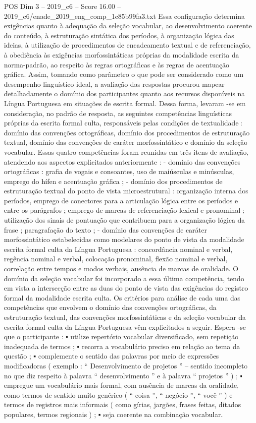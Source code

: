 \begin{textsample}{POS Dim 3 – 2019\_c6 – Score 16.00 – 2019\_c6/enade\_2019\_eng\_comp\_1c85b99fa3.txt}
Essa configuração determina exigências quanto à adequação da seleção vocabular, ao desenvolvimento coerente do conteúdo, à estruturação sintática dos períodos, à organização lógica das ideias, à utilização de procedimentos de encadeamento textual e de referenciação, à obediência às exigências morfossintáticas próprias da modalidade escrita da norma-padrão, ao respeito às regras ortográficas e às regras de acentuação gráfica.
Assim, tomando como parâmetro o que pode ser considerado como um desempenho linguístico ideal, a avaliação das respostas procurou mapear detalhadamente o domínio dos participantes quanto aos recursos disponíveis na Língua Portuguesa em situações de escrita formal.
Dessa forma, levaram -se em consideração, no padrão de resposta, as seguintes competências linguísticas próprias da escrita formal culta, responsáveis pelas condições de textualidade : domínio das convenções ortográficas, domínio dos procedimentos de estruturação textual, domínio das convenções de caráter morfossintático e domínio da seleção vocabular.
Essas quatro competências foram reunidas em três itens de avaliação, atendendo aos aspectos explicitados anteriormente : - domínio das convenções ortográficas : grafia de vogais e consoantes, uso de maiúsculas e minúsculas, emprego do hífen e acentuação gráfica ; - domínio dos procedimentos de estruturação textual do ponto de vista microestrutural : organização interna dos períodos, emprego de conectores para a articulação lógica entre os períodos e entre os parágrafos ; emprego de marcas de referenciação lexical e pronominal ; utilização dos sinais de pontuação que contribuem para a organização lógica da frase ; paragrafação do texto ; - domínio das convenções de caráter morfossintático estabelecidas como modelares do ponto de vista da modalidade escrita formal culta da Língua Portuguesa : concordância nominal e verbal, regência nominal e verbal, colocação pronominal, flexão nominal e verbal, correlação entre tempos e modos verbais, ausência de marcas de oralidade.
O domínio da seleção vocabular foi incorporado a essa última competência, tendo em vista a intersecção entre as duas do ponto de vista das exigências do registro formal da modalidade escrita culta.
Os critérios para análise de cada uma das competências que envolvem o domínio das convenções ortográficas, da estruturação textual, das convenções morfossintáticas e da seleção vocabular da escrita formal culta da Língua Portuguesa vêm explicitados a seguir.
Espera -se que o participante : {\EmojiFont ▪} utilize repertório vocabular diversificado, sem repetição inadequada de termos ; {\EmojiFont ▪} recorra a vocabulário preciso em relação ao tema da questão ; {\EmojiFont ▪} complemente o sentido das palavras por meio de expressões modificadoras ( exemplo : “ Desenvolvimento de projetos ” – sentido incompleto no que diz respeito à palavra “ desenvolvimento ” e à palavra “ projetos ” ) ; {\EmojiFont ▪} empregue um vocabulário mais formal, com ausência de marcas da oralidade, como termos de sentido muito genérico ( “ coisa ”, “ negócio ”, “ você ” ) e termos de registros mais informais ( como gírias, jargões, frases feitas, ditados populares, termos regionais ) ; {\EmojiFont ▪} seja coerente na combinação vocabular.

\end{textsample}
